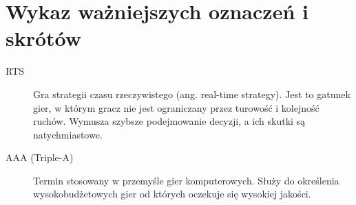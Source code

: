 \chapter*{Wykaz ważniejszych oznaczeń i skrótów}
\begin{description}
\item[RTS] Gra strategii czasu rzeczywistego (ang. real-time strategy). Jest to gatunek gier, w którym gracz nie jest
ograniczany przez turowość i kolejność ruchów. Wymusza szybsze podejmowanie decyzji, a ich skutki są natychmiastowe.
\item[AAA (Triple-A)] Termin stosowany w przemyśle gier komputerowych. Służy do określenia wysokobudżetowych gier od
których oczekuje się wysokiej jakości.
\end{description}
